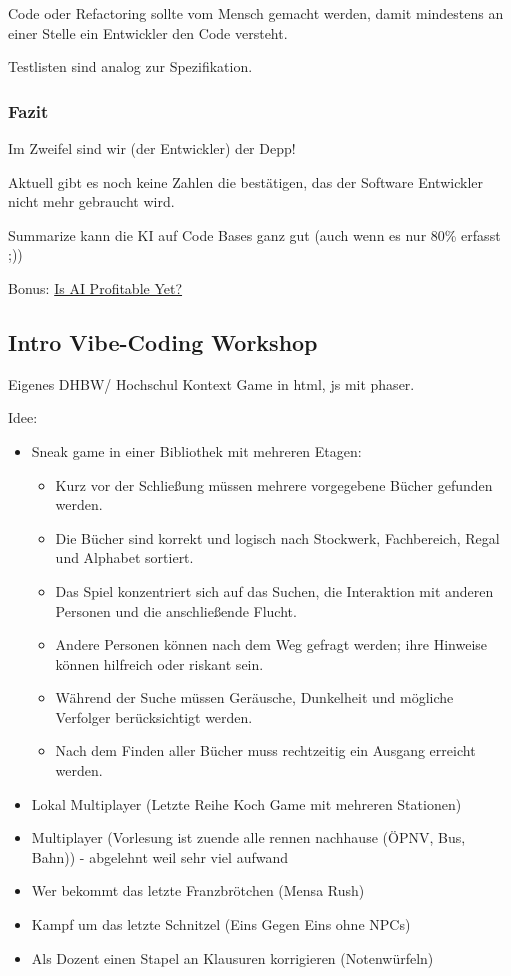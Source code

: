 \documentclass[a4paper]{article}
\begin{document}
Code oder Refactoring sollte vom Mensch gemacht werden, damit mindestens an einer Stelle ein Entwickler den Code versteht.

Testlisten sind analog zur Spezifikation.

\subsubsection{Fazit}

Im Zweifel sind wir (der Entwickler) der Depp!

Aktuell gibt es noch keine Zahlen die bestätigen, das der Software Entwickler nicht mehr gebraucht wird.

Summarize kann die KI auf Code Bases ganz gut (auch wenn es nur 80\% erfasst ;))

Bonus: \href{https://isaiprofitable.com/}{Is AI Profitable Yet?}

\subsection{Intro Vibe-Coding Workshop}

Eigenes DHBW/ Hochschul Kontext Game in html, js mit phaser.

Idee:

\begin{itemize}
    \item Sneak game in einer Bibliothek mit mehreren Etagen:
    \begin{itemize}
        \item Kurz vor der Schließung müssen mehrere vorgegebene Bücher gefunden werden.
        \item Die Bücher sind korrekt und logisch nach Stockwerk, Fachbereich, Regal und Alphabet sortiert.
        \item Das Spiel konzentriert sich auf das Suchen, die Interaktion mit anderen Personen und die anschließende Flucht.
        \item Andere Personen können nach dem Weg gefragt werden; ihre Hinweise können hilfreich oder riskant sein.
        \item Während der Suche müssen Geräusche, Dunkelheit und mögliche Verfolger berücksichtigt werden.
        \item Nach dem Finden aller Bücher muss rechtzeitig ein Ausgang erreicht werden.
    \end{itemize}
    \item Lokal Multiplayer (Letzte Reihe Koch Game mit mehreren Stationen)
    \item Multiplayer (Vorlesung ist zuende alle rennen nachhause (ÖPNV, Bus, Bahn)) - abgelehnt weil sehr viel aufwand
    \item Wer bekommt das letzte Franzbrötchen (Mensa Rush)
    \item Kampf um das letzte Schnitzel (Eins Gegen Eins ohne NPCs)
    \item Als Dozent einen Stapel an Klausuren korrigieren (Notenwürfeln)
\end{itemize}
\end{document}
